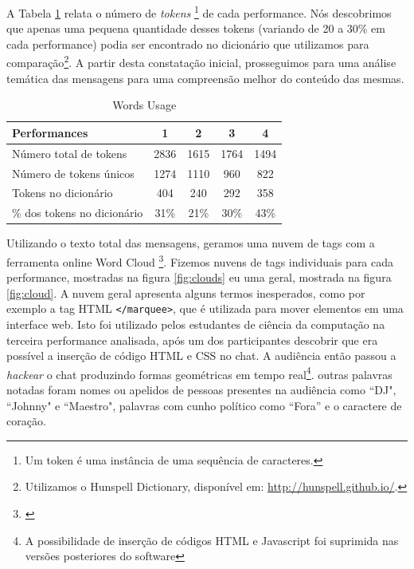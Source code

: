 A Tabela \ref{tab:words} relata o número de \emph{tokens} \footnote{Um token é uma instância de uma sequência de caracteres.} de cada performance. Nós descobrimos que apenas uma pequena quantidade desses tokens (variando de 20 a 30\% em cada performance) podia ser encontrado no dicionário que utilizamos para comparação\footnote{Utilizamos o Hunspell Dictionary, disponível em: \url{http://hunspell.github.io/}.}. A partir desta constatação inicial, prosseguimos para uma análise temática das mensagens para uma compreensão melhor do conteúdo das mesmas.




\begin{table}[ht!]
\caption{Words Usage}{%
\begin{tabular}{@{}lcccc@{}}
\hline
Performances & 1 & 2 & 3 & 4 \\
\hline
Número total de tokens&     2836&   1615&  1764&   1494\\
Número de tokens únicos& 1274& 1110& 960& 822\\
Tokens no dicionário &      404&   240&  292&   358\\
\% dos tokens no dicionário &       31\%&   21\%&  30\%&   43\%\\
\end{tabular}}
\label{tab:words}
\end{table}

Utilizando o texto total das mensagens, geramos uma nuvem de tags com a ferramenta online Word Cloud \footnote{\cite{JasonDavies}}. Fizemos nuvens de tags individuais para cada performance, mostradas na figura \ref{fig:clouds} eu uma geral, mostrada na figura \ref{fig:cloud}. A nuvem geral apresenta alguns termos inesperados, como por exemplo a tag HTML \texttt{</marquee>}, que é utilizada para mover elementos em uma interface web. Isto foi utilizado pelos estudantes de ciência da computação na terceira performance analisada, após um dos participantes descobrir que era possível a inserção de código HTML e CSS no chat. A audiência então passou a \emph{hackear} o chat produzindo formas geométricas em tempo real\footnote{A possibilidade de inserção de códigos HTML e Javascript foi suprimida nas versões posteriores do software}. outras palavras notadas foram nomes ou apelidos de pessoas presentes na audiência como ``DJ", ``Johnny" e ``Maestro", palavras com cunho político como ``Fora'' e o caractere de coração. 



